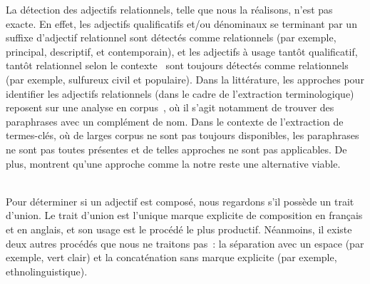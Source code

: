       La détection des adjectifs relationnels, telle que nous la réalisons,
      n'est pas exacte. En effet, les adjectifs qualificatifs et/ou dénominaux
      se terminant par un suffixe d'adjectif relationnel sont détectés comme
      relationnels (par exemple, \og{}principal\fg{}, \og{}descriptif\fg{}, et
      \og{}contemporain\fg{}), et les adjectifs à usage tantôt qualificatif,
      tantôt relationnel selon le contexte~\cite{maniez2009denominaladjectives}
      sont toujours détectés comme relationnels (par exemple,
      \og{}sulfureux\fg{} \og{}civil\fg{} et \og{}populaire\fg{}). Dans la
      littérature, les approches pour identifier les adjectifs relationnels
      (dans le cadre de l'extraction terminologique) reposent sur une analyse en
      corpus~\cite{daille2000relationaladjectives,maniez2005automaticrelationaladjectiveidentification,harastani2013relationaladjectivetranslation},
      où il s'agit notamment de trouver des paraphrases avec un complément de
      nom. Dans le contexte de l'extraction de termes-clés, où de larges corpus
      ne sont pas toujours disponibles, les paraphrases ne sont pas toutes
      présentes et de telles approches ne sont pas applicables. De plus,
       montrent qu'une
      approche comme la notre reste une alternative viable.

      ~\\Pour déterminer si un adjectif est composé, nous regardons s'il possède
      un trait d'union. Le trait d'union est l'unique marque explicite de
      composition en français et en anglais, et son usage est le procédé le plus
      productif. Néanmoins, il existe deux autres procédés que nous ne traitons
      pas~: la séparation avec un espace (par exemple, \og{}vert clair\fg{}) et
      la concaténation sans marque explicite (par exemple,
      \og{}ethnolinguistique\fg{}).

